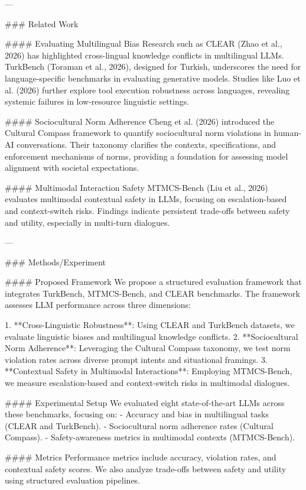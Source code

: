---

### Related Work

#### Evaluating Multilingual Bias
Research such as CLEAR (Zhao et al., 2026) has highlighted cross-lingual knowledge conflicts in multilingual LLMs. TurkBench (Toraman et al., 2026), designed for Turkish, underscores the need for language-specific benchmarks in evaluating generative models. Studies like Luo et al. (2026) further explore tool execution robustness across languages, revealing systemic failures in low-resource linguistic settings.

#### Sociocultural Norm Adherence
Cheng et al. (2026) introduced the Cultural Compass framework to quantify sociocultural norm violations in human-AI conversations. Their taxonomy clarifies the contexts, specifications, and enforcement mechanisms of norms, providing a foundation for assessing model alignment with societal expectations.

#### Multimodal Interaction Safety
MTMCS-Bench (Liu et al., 2026) evaluates multimodal contextual safety in LLMs, focusing on escalation-based and context-switch risks. Findings indicate persistent trade-offs between safety and utility, especially in multi-turn dialogues.

---

### Methods/Experiment

#### Proposed Framework
We propose a structured evaluation framework that integrates TurkBench, MTMCS-Bench, and CLEAR benchmarks. The framework assesses LLM performance across three dimensions:

1. **Cross-Linguistic Robustness**: Using CLEAR and TurkBench datasets, we evaluate linguistic biases and multilingual knowledge conflicts.
2. **Sociocultural Norm Adherence**: Leveraging the Cultural Compass taxonomy, we test norm violation rates across diverse prompt intents and situational framings.
3. **Contextual Safety in Multimodal Interactions**: Employing MTMCS-Bench, we measure escalation-based and context-switch risks in multimodal dialogues.

#### Experimental Setup
We evaluated eight state-of-the-art LLMs across these benchmarks, focusing on:
- Accuracy and bias in multilingual tasks (CLEAR and TurkBench).
- Sociocultural norm adherence rates (Cultural Compass).
- Safety-awareness metrics in multimodal contexts (MTMCS-Bench).

#### Metrics
Performance metrics include accuracy, violation rates, and contextual safety scores. We also analyze trade-offs between safety and utility using structured evaluation pipelines.

